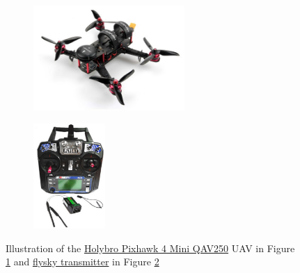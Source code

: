 \documentclass[../Head/report.tex]{subfiles}
\begin{document}
\begin{figure}[H]
    \centering
    \begin{subfigure}[b]{.4\textwidth}
        \centering
        \includegraphics[height=4.0cm]{../Figures/drone/holybro_pixhawk_mini.png}
        \caption{}
        \label{fig:holybro_pixhawk_mini_drone}
    \end{subfigure}
    \begin{subfigure}[b]{.33\textwidth}
        \centering
        \includegraphics[height=4.0cm]{../Figures/drone/flysky_transmitter.png}
        \caption{}
        \label{fig:flysky_transmitter}
    \end{subfigure}
    \caption{Illustration of the \href{https://www.banggood.com/da/Holybro-Pixhawk-4-Mini-QAV250-Basic-Kit-RC-Quadcopter-RC-Drone-W-or-Pixhawk-4-GPS-DR2205-KV2300-Motor-p-1438132.html?utm\_source=googleshopping&utm\_medium=cpc\_organic&gmcCountry=DK&utm\_content=minha&utm\_campaign=minha-dk-da-pc&currency=DKK&cur\_warehouse=CN&createTmp=1&ID=567322&utm\_source=googleshopping&utm\_medium=cpc\_union&utm\_content=sandra&utm\_campaign=sandra-ssc-dk-da-all-0302&ad\_id=337427030565&gclid=CjwKCAjwmv-DBhAMEiwA7xYrd4Bgzi1gPmtia01iAeXnLyVW9CXudMOZ7eQxM53PrTrgx2OHdLvS1hoCdPIQAvD\_BwE}{Holybro Pixhawk 4 Mini QAV250} UAV in Figure \ref{fig:holybro_pixhawk_mini_drone} and \href{https://www.banggood.com/FlySky-FS-i6-2\_4G-6CH-AFHDS-Remote-Control-Transmitter-With-FS-R6B-Receiver-For-RC-FPV-Drone-Mode-2-p-1420323.html?utm\_source=googleshopping&utm\_medium=cpc\_organic&gmcCountry=DK&utm\_content=minha&utm\_campaign=minha-dk-en-pc&currency=DKK&cur\_warehouse=CN&createTmp=1&utm\_source=googleshopping&utm\_medium=cpc\_bgs&utm\_content=sandra&utm\_campaign=sandra-ssc-dk-en-all-1105-20bf-11sale&ad\_id=477449337289&gclid=CjwKCAjwmv-DBhAMEiwA7xYrdwTH-q0\_ud-CLZ7CMggdiHnZUga0M4Bhc-nwwN5mUIZsSw1DH_ltyxoCsdoQAvD\_BwE}{flysky transmitter} in Figure \ref{fig:flysky_transmitter}}
    \label{fig:holybro_pixhawk_mini}
\end{figure}
\end{document}

